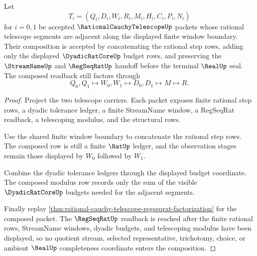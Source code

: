 \begin{theorem}
\label{thm:rational-cauchy-telescope-dyadic-budget-composition}
Let
$$
T_i=(Q_i,D_i,W_i,R_i,M_i,H_i,C_i,P_i,N_i)
$$
for $i=0,1$ be accepted $\RationalCauchyTelescopeUp$ packets whose rational telescope segments are adjacent along the displayed finite window boundary. Their composition is accepted by concatenating the rational step rows, adding only the displayed $\DyadicRatCoreUp$ budget rows, and preserving the $\StreamNameUp$ and $\RegSeqRatUp$ handoff before the terminal $\RealUp$ seal. The composed readback still factors through
$$
Q_0,Q_1 \longmapsto W_0,W_1 \longmapsto D_0,D_1 \longmapsto M \longmapsto R .
$$
\end{theorem}
\begin{proof}
Project the two telescope carriers. Each packet exposes finite rational step rows, a dyadic tolerance ledger, a finite StreamName window, a RegSeqRat readback, a telescoping modulus, and the structural rows.

Use the shared finite window boundary to concatenate the rational step rows. The composed row is still a finite $\RatUp$ ledger, and the observation stages remain those displayed by $W_0$ followed by $W_1$.

Combine the dyadic tolerance ledgers through the displayed budget coordinate. The composed modulus row records only the sum of the visible $\DyadicRatCoreUp$ budgets needed for the adjacent segments.

Finally replay \autoref{thm:rational-cauchy-telescope-regseqrat-factorization} for the composed packet. The $\RegSeqRatUp$ readback is reached after the finite rational rows, StreamName windows, dyadic budgets, and telescoping modulus have been displayed, so no quotient stream, selected representative, trichotomy, choice, or ambient $\RealUp$ completeness coordinate enters the composition.
\end{proof}


\begin{closurestatus}{\RationalCauchyTelescopeUp}
  \theoryclosure{\seedClosure}
  \formalstatus{\unformalizedV}
\end{closurestatus}
